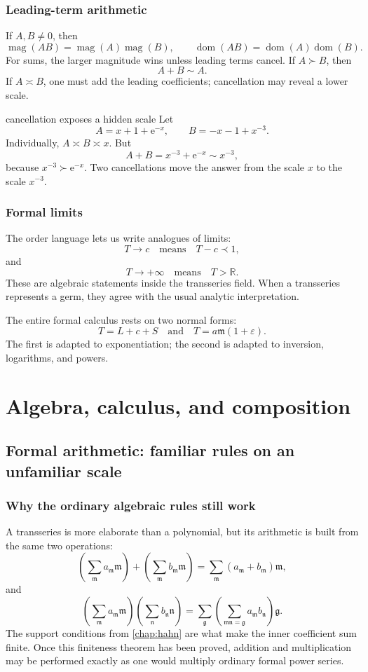 \documentclass[11pt,openany]{book}
\theoremstyle{plain}
\theoremstyle{definition}
\theoremstyle{remark}
\newcommand{\R}{\mathbb{R}}
\newcommand{\m}{\mathfrak{m}}
\newcommand{\n}{\mathfrak{n}}
\newcommand{\g}{\mathfrak{g}}
\newcommand{\magop}{\operatorname{mag}}
\newcommand{\domop}{\operatorname{dom}}
\newcommand{\e}{\mathrm{e}}
\begin{document}
\section{Leading-term arithmetic}
If $A,B\ne0$, then
\[
  \magop(AB)=\magop(A)\magop(B),
  \qquad
  \domop(AB)=\domop(A)\domop(B).
\]
For sums, the larger magnitude wins unless leading terms cancel. If $A\succ B$, then
\[
  A+B\sim A.
\]
If $A\asymp B$, one must add the leading coefficients; cancellation may reveal a lower scale.

\begin{workedbox}{cancellation exposes a hidden scale}
Let
\[
  A=x+1+\e^{-x},
  \qquad
  B=-x-1+x^{-3}.
\]
Individually, $A\asymp B\asymp x$. But
\[
  A+B=x^{-3}+\e^{-x}\sim x^{-3},
\]
because $x^{-3}\succ\e^{-x}$. Two cancellations move the answer from the scale $x$ to the scale $x^{-3}$.
\end{workedbox}

\section{Formal limits}
The order language lets us write analogues of limits:
\[
  T\to c
  \quad\text{means}\quad
  T-c\prec1,
\]
and
\[
  T\to+\infty
  \quad\text{means}\quad
  T>\R.
\]
These are algebraic statements inside the transseries field. When a transseries represents a germ, they agree with the usual analytic interpretation.

\begin{checkpointbox}
The entire formal calculus rests on two normal forms:
\[
  T=L+c+S
  \quad\text{and}\quad
  T=a\m(1+\varepsilon).
\]
The first is adapted to exponentiation; the second is adapted to inversion, logarithms, and powers.
\end{checkpointbox}

\part{Algebra, calculus, and composition}

\chapter{Formal arithmetic: familiar rules on an unfamiliar scale}
\label{chap:arithmetic}

\section{Why the ordinary algebraic rules still work}
A transseries is more elaborate than a polynomial, but its arithmetic is built from the same two operations:
\[
  \left(\sum_{\m}a_{\m}\m\right)
  +\left(\sum_{\m}b_{\m}\m\right)
  =\sum_{\m}(a_{\m}+b_{\m})\m,
\]
and
\[
  \left(\sum_{\m}a_{\m}\m\right)
  \left(\sum_{\n}b_{\n}\n\right)
  =\sum_{\g}
   \left(\sum_{\m\n=\g}a_{\m}b_{\n}\right)\g.
\]
The support conditions from \cref{chap:hahn} are what make the inner coefficient sum finite. Once this finiteness theorem has been proved, addition and multiplication may be performed exactly as one would multiply ordinary formal power series.
\end{document}

